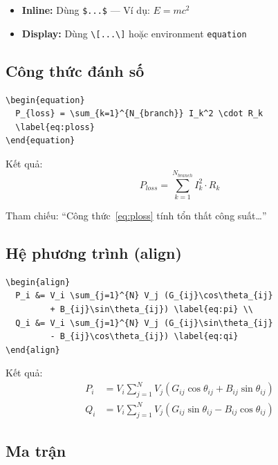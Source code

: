 \begin{itemize}
  \item \textbf{Inline:} Dùng \verb|$...$| --- Ví dụ: $E = mc^2$
  \item \textbf{Display:} Dùng \verb|\[...\]| hoặc environment \texttt{equation}
\end{itemize}

\subsection{Công thức đánh số}

\begin{lstlisting}[style=latexstyle]
\begin{equation}
  P_{loss} = \sum_{k=1}^{N_{branch}} I_k^2 \cdot R_k
  \label{eq:ploss}
\end{equation}
\end{lstlisting}

Kết quả:
\begin{equation}
  P_{loss} = \sum_{k=1}^{N_{branch}} I_k^2 \cdot R_k
  \label{eq:ploss}
\end{equation}

Tham chiếu: ``Công thức~\eqref{eq:ploss} tính tổn thất công suất\ldots''

\subsection{Hệ phương trình (align)}

\begin{lstlisting}[style=latexstyle]
\begin{align}
  P_i &= V_i \sum_{j=1}^{N} V_j (G_{ij}\cos\theta_{ij}
         + B_{ij}\sin\theta_{ij}) \label{eq:pi} \\
  Q_i &= V_i \sum_{j=1}^{N} V_j (G_{ij}\sin\theta_{ij}
         - B_{ij}\cos\theta_{ij}) \label{eq:qi}
\end{align}
\end{lstlisting}

Kết quả:
\begin{align}
  P_i &= V_i \sum_{j=1}^{N} V_j (G_{ij}\cos\theta_{ij} + B_{ij}\sin\theta_{ij}) \label{eq:pi} \\
  Q_i &= V_i \sum_{j=1}^{N} V_j (G_{ij}\sin\theta_{ij} - B_{ij}\cos\theta_{ij}) \label{eq:qi}
\end{align}

\subsection{Ma trận}

